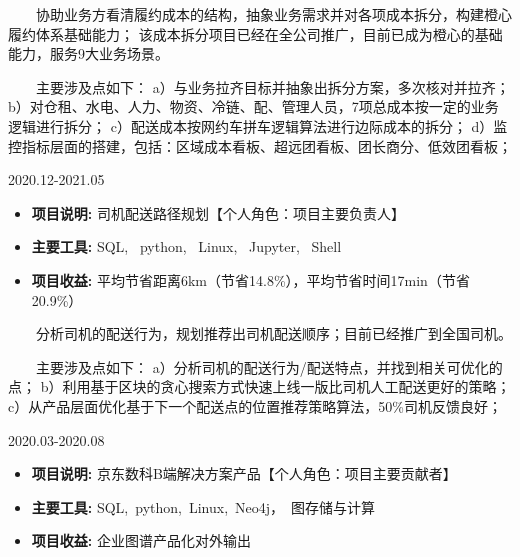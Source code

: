 \documentclass{resume}
\begin{document}
{    \ \ \ \ 
协助业务方看清履约成本的结构，抽象业务需求并对各项成本拆分，构建橙心履约体系基础能力；
该成本拆分项目已经在全公司推广，目前已成为橙心的基础能力，服务9大业务场景。

\ \ \ \ 主要涉及点如下：
a）与业务拉齐目标并抽象出拆分方案，多次核对并拉齐；
b）对仓租、水电、人力、物资、冷链、配、管理人员，7项总成本按一定的业务逻辑进行拆分；
c）配送成本按网约车拼车逻辑算法进行边际成本的拆分；
d）监控指标层面的搭建，包括：区域成本看板、超远团看板、团长商分、低效团看板；

\medskip











                      {2020.12-2021.05}

\begin{itemize}  [parsep=0.5ex]

  \item   \textbf{  项目说明:  }   { 司机配送路径规划【个人角色：项目主要负责人】 } 
  \item   \textbf{  主要工具:  }   {  SQL, \ python, \ Linux, \ Jupyter, \ Shell }
  \item   \textbf{  项目收益:  }   {  平均节省距离6km（节省14.8\%），平均节省时间17min（节省20.9\%） }

\end{itemize}


{    \ \ \ \ 
分析司机的配送行为，规划推荐出司机配送顺序；目前已经推广到全国司机。

\ \ \ \ 主要涉及点如下：
a）分析司机的配送行为/配送特点，并找到相关可优化的点；
b）利用基于区块的贪心搜索方式快速上线一版比司机人工配送更好的策略；
c）从产品层面优化基于下一个配送点的位置推荐策略算法，50\%司机反馈良好；
}

\medskip















                      {2020.03-2020.08}

\begin{itemize}  [parsep=0.5ex]

  \item   \textbf{  项目说明:  }   {  京东数科B端解决方案产品【个人角色：项目主要贡献者】  } 
  \item   \textbf{  主要工具:  }   {  SQL,\ python,\ Linux,\ Neo4j，\ 图存储与计算 }
  \item   \textbf{  项目收益:  }   {  企业图谱产品化对外输出 }


\end{itemize}}
\end{document}
